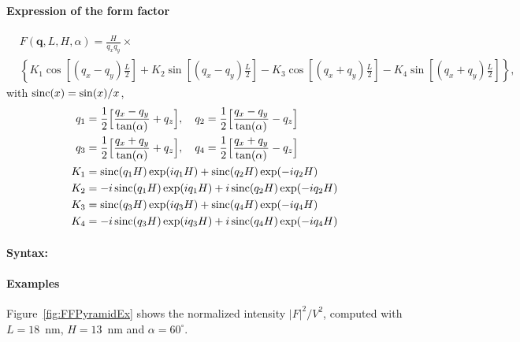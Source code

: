 \paragraph{Expression of the form factor}
\begin{align*}
&F(\mathbf{q},L, H, \alpha) =
\frac{H}{q_x q_y} \times \nonumber \\ &\left\{ K_1 \cos\left[
  (q_x-q_y)\frac{L}{2} \right] + K_2 \sin\left[ (q_x-q_y)\frac{L}{2} \right]
- K_3 \cos\left[ (q_x+q_y) \frac{L}{2} \right] - K_4 \sin\left[ (q_x+q_y)\frac{L}{2} \right]\right\},
\end{align*}
with $\operatorname{sinc}(x)=\sin(x)/x$,
\begin{align*}
       q_1 &=\frac{1}{2}\Big[\frac{q_x-q_y}{\tan(\alpha)} + q_z\Big],\quad       q_2 =\frac{1}{2}\Big[\frac{q_x-q_y}{\tan(\alpha)} - q_z\Big]\\
        q_3 &=\frac{1}{2}\Big[\frac{q_x+q_y}{\tan(\alpha)} + q_z\Big],\quad       q_4 =\frac{1}{2}\Big[\frac{q_x+q_y}{\tan(\alpha)} - q_z\Big]\\
        K_1 &= \operatorname{sinc}(q_1 H)\exp(i q_1 H)  + \operatorname{sinc}(q_2 H) \exp(-i q_2 H)\\
        K_2 &= -i \operatorname{sinc}(q_1 H) \exp(i q_1 H) +i \operatorname{sinc}(q_2 H) \exp(-i q_2 H)\\
        K_3 &= \operatorname{sinc}(q_3 H) \exp(i q_3 H)    + \operatorname{sinc}(q_4 H) \exp(-i q_4 H)\\
        K_4 &= -i \operatorname{sinc}(q_3 H) \exp(i q_3 H) + i \operatorname{sinc}(q_4 H) \exp(-i q_4 H) 
   \end{align*}

\paragraph{Syntax:}  

\paragraph{Examples}
Figure~\ref{fig:FFPyramidEx} shows the normalized intensity
$|F|^2/V^2$, computed with $L=18$~nm, $H=13$~nm and
$\alpha=60^{\circ}$.

